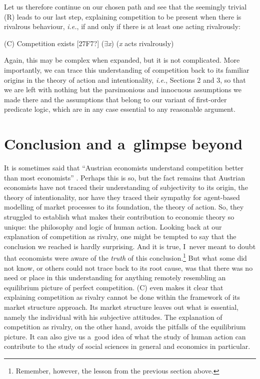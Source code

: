 Let us therefore continue on our chosen path and see that the seemingly trivial (R) leads to our last step, explaining competition to be present when there is rivalrous behaviour, \textit{i.e.}, if and only if there is at least one acting rivalrously:



(C) Competition exists [27F7?] (${\exists}$\textit{x}) (\textit{x} acts rivalrously)



Again, this may be complex when expanded, but it is not complicated. More importantly, we can trace this understanding of competition back to its familiar origins in the theory of action and intentionality, \textit{i.e.}, Sections 2 and 3, so that we are left with nothing but the parsimonious and innocuous assumptions we made there and the assumptions that belong to our variant of first-order predicate logic, which are in any case essential to any reasonable argument.



\section{Conclusion and a~glimpse beyond}

It is sometimes said that ``Austrian economists understand competition better than most economists'' 
\parencite[][p.142]{nell_competition_2010}. %
 Perhaps this is so, but the fact remains that Austrian economists have not traced their understanding of subjectivity to its origin, the theory of intentionality, nor have they traced their sympathy for agent-based modelling of market processes to its foundation, the theory of action. So, they struggled to establish what makes their contribution to economic theory so unique: the philosophy and logic of human action. Looking back at our explanation of competition as rivalry, one might be tempted to say that the conclusion we reached is hardly surprising. And it is true, I~never meant to doubt that economists were aware of the \textit{truth} of this conclusion.\footnote{Remember, however, the lesson from the previous section above.} But what some did not know, or others could not trace back to its root cause, was that there was no need or place in this understanding for anything remotely resembling an equilibrium picture of perfect competition. (C) even makes it clear that explaining competition as rivalry cannot be done within the framework of its market structure approach. Its market structure leaves out what is essential, namely the individual with his subjective attitudes. The explanation of competition as rivalry, on the other hand, avoids the pitfalls of the equilibrium picture. It can also give us a~good idea of what the study of human action can contribute to the study of social sciences in general and economics in particular.



